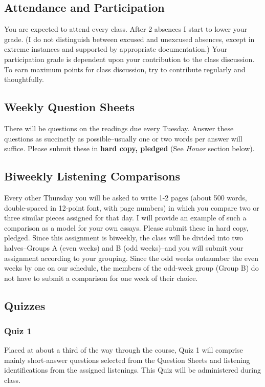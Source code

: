 \documentclass[letterpaper,10pt,english]{sphinxmanual}
\begin{document}
\subsection{Attendance and Participation}
\label{syllabus:attendance-and-participation}
You are expected to attend every class. After 2 absences
I start to lower your grade. (I do not distinguish between
excused and unexcused absences, except in extreme instances
and supported by appropriate documentation.) Your participation
grade is dependent upon your contribution to the class discussion.
To earn maximum points for class discussion, try to contribute regularly and thoughtfully.


\subsection{Weekly Question Sheets}
\label{syllabus:weekly-question-sheets}
There will be questions on the readings due every Tuesday.
Answer these questions as succinctly as possible--usually one or
two words per answer will suffice. Please submit these in \textbf{hard copy, pledged}
(See \emph{Honor} section below).


\subsection{Biweekly Listening Comparisons}
\label{syllabus:biweekly-listening-comparisons}
Every other Thursday you will be asked to write 1-2 pages
(about 500 words, double-spaced in 12-point font, with page numbers)
in which you compare two or three similar pieces assigned for that day.
I will provide an example of such a comparison as a model for your own essays.
Please submit these in hard copy, pledged. Since this assignment is biweekly,
the class will be divided into two halves--Groups A (even weeks)
and B (odd weeks)--and you will submit your assignment according to your
grouping. Since the odd weeks outnumber the even weeks by
one on our schedule, the members of the odd-week group
(Group B) do not have to submit a comparison for one week of their choice.


\subsection{Quizzes}
\label{syllabus:quizzes}

\subsubsection{Quiz 1}
\label{syllabus:quiz-1}
Placed at about a third of the way through the course,
Quiz 1 will comprise mainly short-answer questions selected
from the Question Sheets and listening identifications from the
assigned listenings. This Quiz will be administered during class.
\end{document}
